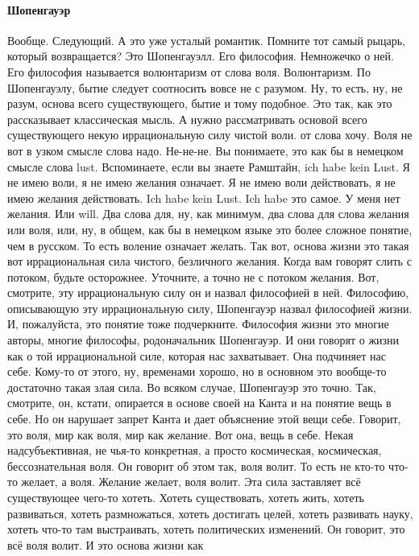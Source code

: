 \paragraph{Шопенгауэр}
Вообще. Следующий. А это уже усталый романтик. Помните тот
самый рыцарь, который возвращается? Это Шопенгауэлл. Его философия. Немножечко о
ней. Его философия называется волюнтаризм от слова воля. Волюнтаризм. По
Шопенгауэлу, бытие следует соотносить вовсе не с разумом. Ну, то есть, ну, не
разум, основа всего существующего, бытие и тому подобное. Это так, как это
рассказывает классическая мысль. А нужно рассматривать основой всего
существующего некую иррациональную силу чистой воли. от слова хочу. Воля не вот
в узком смысле слова надо. Не-не-не. Вы понимаете, это как бы в немецком смысле
слова lust. Вспоминаете, если вы знаете Рамштайн, ich habe kein Lust. Я не имею
воли, я не имею желания означает. Я не имею воли действовать, я не имею желания
действовать. Ich habe kein Lust. Ich habe это самое. У меня нет желания. Или
will. Два слова для, ну, как минимум, два слова для слова желания или воля, или,
ну, в общем, как бы в немецком языке это более сложное понятие, чем в русском.
То есть воление означает желать. Так вот, основа жизни это такая вот
иррациональная сила чистого, безличного желания. Когда вам говорят слить с
потоком, будьте осторожнее. Уточните, а точно не с потоком желания. Вот,
смотрите, эту иррациональную силу он и назвал философией в ней. Философию,
описывающую эту иррациональную силу, Шопенгауэр назвал философией жизни. И,
пожалуйста, это понятие тоже подчеркните. Философия жизни это многие авторы,
многие философы, родоначальник Шопенгауэр. И они говорят о жизни как о той
иррациональной силе, которая нас захватывает. Она подчиняет нас себе. Кому-то от
этого, ну, временами хорошо, но в основном это вообще-то достаточно такая злая
сила. Во всяком случае, Шопенгауэр это точно. Так, смотрите, он, кстати,
опирается в основе своей на Канта и на понятие вещь в себе. Но он нарушает
запрет Канта и дает объяснение этой вещи себе. Говорит, это воля, мир как воля,
мир как желание. Вот она, вещь в себе. Некая надсубъективная, не чья-то
конкретная, а просто космическая, космическая, бессознательная воля. Он говорит
об этом так, воля волит. То есть не кто-то что-то желает, а воля. Желание
желает, воля волит. Эта сила заставляет всё существующее чего-то хотеть. Хотеть
существовать, хотеть жить, хотеть развиваться, хотеть размножаться, хотеть
достигать целей, хотеть развивать науку, хотеть что-то там выстраивать, хотеть
политических изменений. Он говорит, это всё воля волит. И это основа жизни как
